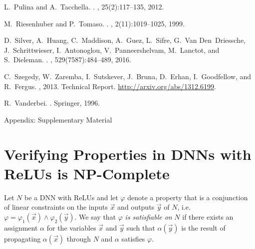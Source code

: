 \documentclass[a4paper]{llncs}
\newcommand{\assignment}{\alpha{}}
\begin{document}
{\begin{thebibliography}{10}
L.~Pulina and A.~Tacchella.
.
, 25(2):117--135, 2012.

M.~Riesenhuber and P.~Tomaso.
.
, 2(11):1019--1025, 1999.

D.~Silver, A.~Huang, C.~Maddison, A.~Guez, L.~Sifre, G.~Van Den~Driessche,
  J.~Schrittwieser, I.~Antonoglou, V.~Panneershelvam, M.~Lanctot, and
  S.~Dieleman.
.
, 529(7587):484--489, 2016.

C.~Szegedy, W.~Zaremba, I.~Sutskever, J.~Bruna, D.~Erhan, I.~Goodfellow, and
  R.~Fergus.
, 2013.
\newblock Technical Report. \url{http://arxiv.org/abs/1312.6199}.

R.~Vanderbei.
.
\newblock Springer, 1996.

\end{thebibliography}
}


\renewcommand{\thesection}{\Roman{section}} 
\renewcommand{\thesubsection}{\Roman{subsection}} 
\setcounter{section}{0}

\newpage
\noindent
{\huge Appendix: Supplementary Material}

\section{Verifying Properties in DNNs with ReLUs is NP-Complete}
\label{appendix:npc}

Let $N$ be a DNN with ReLUs and
let $\varphi$ denote a property that is a conjunction of linear
constraints on the inputs $\vec{x}$ and outputs $\vec{y}$ of $N$, i.e. $\varphi =
\varphi_1(\vec{x})\wedge\varphi_2(\vec{y})$.
We say that $\varphi$ \emph{is satisfiable on} $N$ if 
there exists an assignment $\assignment$ for
the variables $\vec{x}$ and $\vec{y}$ such that $\assignment(\vec{y})$ is the result
of propagating $\assignment(\vec{x})$ through $N$ and $\assignment$ satisfies $\varphi$.
\end{document}
